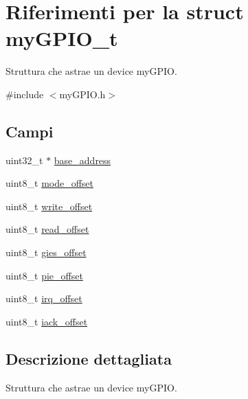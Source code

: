 \hypertarget{structmy_g_p_i_o__t}{\section{Riferimenti per la struct my\+G\+P\+I\+O\+\_\+t}
\label{structmy_g_p_i_o__t}
}


Struttura che astrae un device my\+G\+P\+I\+O.  




{\ttfamily \#include $<$my\+G\+P\+I\+O.\+h$>$}

\subsection*{Campi}
\begin{DoxyCompactItemize}
\item 
uint32\+\_\+t $\ast$ \hyperlink{structmy_g_p_i_o__t_a79c591d5fa42efdf86abd98347fece90}{base\+\_\+address}
\item 
uint8\+\_\+t \hyperlink{structmy_g_p_i_o__t_ad21272e5293d7c1e7ccafe35a2e129d1}{mode\+\_\+offset}
\item 
uint8\+\_\+t \hyperlink{structmy_g_p_i_o__t_abb65e5db6d4ad365a7c48d00e4af1f78}{write\+\_\+offset}
\item 
uint8\+\_\+t \hyperlink{structmy_g_p_i_o__t_ab65acde67dc46f1d163e2ee468420b48}{read\+\_\+offset}
\item 
uint8\+\_\+t \hyperlink{structmy_g_p_i_o__t_a396df54cd6cf921c00ea28779db8de42}{gies\+\_\+offset}
\item 
uint8\+\_\+t \hyperlink{structmy_g_p_i_o__t_ae5f1d610c87917b9dd6fbb5af534faf0}{pie\+\_\+offset}
\item 
uint8\+\_\+t \hyperlink{structmy_g_p_i_o__t_a75a81dd8e3333cb69aa4938d82b5e433}{irq\+\_\+offset}
\item 
uint8\+\_\+t \hyperlink{structmy_g_p_i_o__t_a89b56f53628a6e25587385a964248793}{iack\+\_\+offset}
\end{DoxyCompactItemize}


\subsection{Descrizione dettagliata}
Struttura che astrae un device my\+G\+P\+I\+O. 

